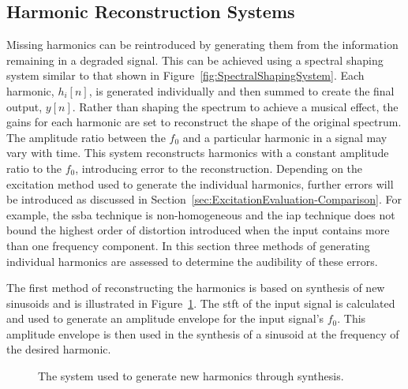 	\subsection{Harmonic Reconstruction Systems}
	\label{sec:PerceptualExperiments-Reconstruction-Systems}
		Missing harmonics can be reintroduced by generating them from the information remaining in a degraded
		signal. This can be achieved using a spectral shaping system similar to that shown in
		Figure~\ref{fig:SpectralShapingSystem}. Each harmonic, $h_{i}[n]$, is generated individually and then
		summed to create the final output, $y[n]$. Rather than shaping the spectrum to achieve a musical effect,
		the gains for each harmonic are set to reconstruct the shape of the original spectrum. The amplitude ratio
		between the $f_{0}$ and a particular harmonic in a signal may vary with time. This system reconstructs
		harmonics with a constant amplitude ratio to the $f_{0}$, introducing error to the reconstruction.
		Depending on the excitation method used to generate the individual harmonics, further errors will be
		introduced as discussed in Section~\ref{sec:ExcitationEvaluation-Comparison}. For example, the
		\acrshort{ssba} technique is non-homogeneous and the \acrshort{iap} technique does not bound the highest
		order of distortion introduced when the input contains more than one frequency component. In this section
		three methods of generating individual harmonics are assessed to determine the audibility of these errors.

		The first method of reconstructing the harmonics is based on synthesis of new sinusoids and is illustrated
		in Figure~\ref{fig:Synthesise}. The \acrshort{stft} of the input signal is calculated and used to generate
		an amplitude envelope for the input signal's $f_{0}$. This amplitude envelope is then used in the synthesis
		of a sinusoid at the frequency of the desired harmonic.

		\begin{figure}[h!]
			\centering
			\caption{The system used to generate new harmonics through synthesis.}
			\label{fig:Synthesise}
		\end{figure}

